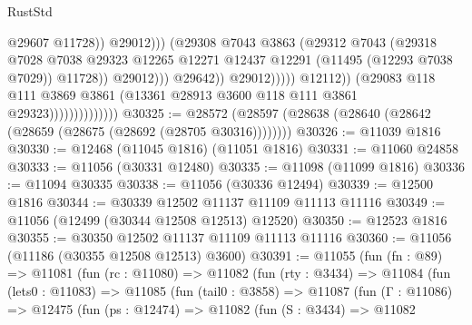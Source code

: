 \begin{lexlean}{RustStd}
\begin{coremodule}
                                                            @29607
                                                            @11728))
                                                        @29012)))
                                                  (@29308
                                                    @7043
                                                    @3863
                                                    (@29312
                                                      @7043
                                                      (@29318
                                                        @7028
                                                        @7038
                                                        @29323
                                                        @12265
                                                        @12271
                                                        @12437
                                                        @12291
                                                        (@11495 (@12293 @7038 @7029))
                                                        @11728))
                                                    @29012)))
                                              @29642))
                                          @29012)))))
                                @12112))
                            (@29083
                              @118
                              @111
                              @3869
                              @3861
                              (@13361 @28913 @3600 @118 @111 @3861 @29323))))))))))))))
@30325 := @28572 (@28597 (@28638 (@28640 (@28642 (@28659 (@28675 (@28692 (@28705 @30316))))))))
@30326 := @11039 @1816
@30330 := @12468 (@11045 @1816) (@11051 @1816)
@30331 := @11060 @24858
@30333 := @11056 (@30331 @12480)
@30335 := @11098 (@11099 @1816)
@30336 := @11094 @30335
@30338 := @11056 (@30336 @12494)
@30339 := @12500 @1816
@30344 := @30339 @12502 @11137 @11109 @11113 @11116
@30349 := @11056 (@12499 (@30344 @12508 @12513) @12520)
@30350 := @12523 @1816
@30355 := @30350 @12502 @11137 @11109 @11113 @11116
@30360 := @11056 (@11186 (@30355 @12508 @12513) @3600)
@30391 := @11055
    (fun (fn : @89) =>
    @11081
      (fun (rc : @11080) =>
      @11082
        (fun (rty : @3434) =>
        @11084
          (fun (lets0 : @11083) =>
          @11085
            (fun (tail0 : @3858) =>
            @11087
              (fun (Γ : @11086) =>
              @12475
                (fun (ps : @12474) =>
                @11082
                  (fun (S : @3434) =>
                  @11082

\end{coremodule}
\end{lexlean}
